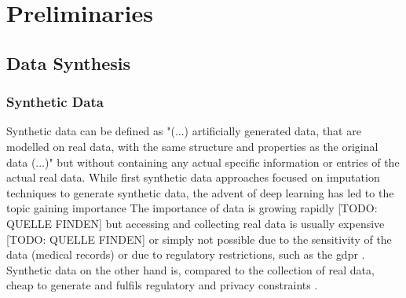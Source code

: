 \chapter{Preliminaries}
\label{ch:preliminaries}

\section{Data Synthesis}
\label{ch:preliminaries-dataSynthesis}

\subsection{Synthetic Data}
\label{ch:preliminaries-dataSynthesis-syntheticData}
Synthetic data can be defined as "(...) artificially generated data, that are modelled on real data, with the same structure and properties as the original data (...)" \cite[p. 2]{kaloskampis2020SyntheticDataCivil} 
but without containing any actual specific information or entries of the actual real data. 
While first synthetic data approaches \cite{gelman1992InferenceIterativeSimulationa} focused on imputation techniques to generate synthetic data, the advent of deep learning has led to the topic gaining importance \cite{kowalczyk2022TaxonomyUseSynthetic, kaloskampis2020SyntheticDataCivil}
The importance of data is growing rapidly [TODO: QUELLE FINDEN] but accessing and collecting real data is usually expensive [TODO: QUELLE FINDEN] or simply not possible due to the sensitivity of the data (\eg medical records) \cite{esteban2017RealvaluedMedicalTimea} or due to regulatory restrictions, such as the \gls{gdpr} \cite{european_commission_regulation_2016}.
Synthetic data on the other hand is, compared to the collection of real data, cheap to generate \cite{leminh2021AirGenGANbasedSynthetica} and fulfils regulatory and privacy constraints \cite{zhao2022CTABGANEnhancingTabular}.

